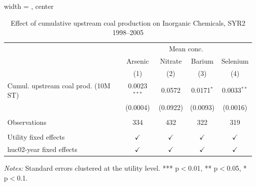 
\begin{table}[htbp]
   
   \caption{\label{tab:6yr_huc02fe_inorg_ravalli_2005} Effect of cumulative upstream coal production on Inorganic Chemicals, SYR2 1998--2005}
   \bigskip
   
   \centering
   
   \begin{adjustbox}{width = \textwidth, center}
      
      
      \begin{tabular}{lcccc}
         \toprule
         
          & \multicolumn{4}{c}{Mean conc.}\\
         
                                             & Arsenic        & Nitrate       & Barium        & Selenium \\   
         
                                             & (1)            & (2)           & (3)           & (4)\\  
         
         \midrule 
         Cumul. upstream coal prod. (10M ST) & 0.0023$^{***}$ & 0.0572        & 0.0171$^{*}$  & 0.0033$^{**}$\\   
                                             & (0.0004)       & (0.0922)      & (0.0093)      & (0.0016)\\   
         
          \\
         
         Observations                        & 334            & 432           & 322           & 319\\  
         
          \\
         
         Utility fixed effects               & $\checkmark$   & $\checkmark$  & $\checkmark$  & $\checkmark$\\   
         huc02-year fixed effects            & $\checkmark$   & $\checkmark$  & $\checkmark$  & $\checkmark$\\   
         
         \bottomrule
         
      \end{tabular}
      
      
      
   \end{adjustbox}
      {\tiny\linespread{1}\selectfont \par \raggedright 
   \textit{Notes:} Standard errors clustered at the utility level. *** p$<$0.01, ** p$<$0.05, * p$<$0.1.}
   
\end{table}


